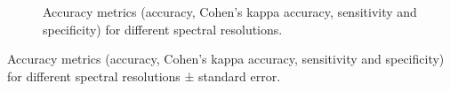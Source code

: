 \documentclass[
  letterpaper,
  11pt,
  english,
  singlespacing,
  headsepline]{MastersDoctoralThesis}
\begin{document}
\begin{spacing}{1.5}
\begin{figure}


\caption{\label{fig-MetricsFIG}Accuracy metrics (accuracy, Cohen's kappa
accuracy, sensitivity and specificity) for different spectral
resolutions.}

\end{figure}%

\begin{table}

\caption{\label{tbl-metricsTable}Accuracy metrics (accuracy, Cohen's
kappa accuracy, sensitivity and specificity) for different spectral
resolutions ± standard error.}

\end{table}
\end{spacing}
\end{document}
